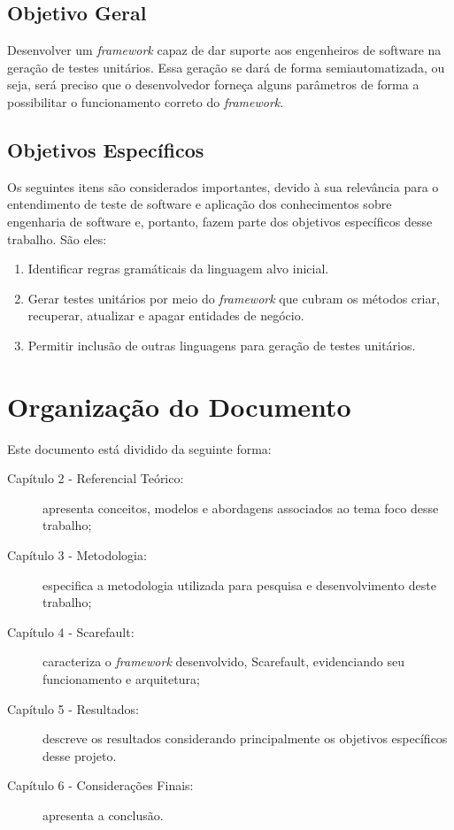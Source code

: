\subsection{Objetivo Geral}
Desenvolver um \textit{framework} capaz de dar suporte aos engenheiros de
software na geração de testes unitários.  Essa geração se dará de forma
semiautomatizada, ou seja, será preciso que o desenvolvedor forneça alguns
parâmetros de forma a possibilitar o funcionamento correto do
\textit{framework}.

\subsection{Objetivos Específicos} \label{objspec}
Os seguintes itens são considerados importantes, devido à sua relevância para o
entendimento de teste de software e aplicação dos conhecimentos sobre
engenharia de software e, portanto, fazem parte dos objetivos específicos desse
trabalho. São eles:
\begin{enumerate}

  \item Identificar regras gramáticais da linguagem alvo inicial.

  \item Gerar testes unitários por meio do \textit{framework} que cubram
    os métodos criar, recuperar, atualizar e apagar entidades de negócio.
    
  \item Permitir inclusão de outras linguagens para geração de testes unitários.

\end{enumerate}

\section{Organização do Documento}
  Este documento está dividido da seguinte forma:

\begin{description}
  \item[Capítulo 2 - Referencial Teórico:] apresenta conceitos, modelos e
    abordagens associados ao tema foco desse trabalho;

  \item[Capítulo 3 - Metodologia:] especifica a metodologia utilizada para
    pesquisa e desenvolvimento deste trabalho;

  \item[Capítulo 4 - Scarefault:] caracteriza o \textit{framework} desenvolvido, Scarefault, evidenciando seu funcionamento e arquitetura;

  \item[Capítulo 5 - Resultados:] descreve os resultados considerando principalmente os objetivos específicos desse projeto.
  
  \item[Capítulo 6 - Considerações Finais:] apresenta a conclusão.
\end{description}
